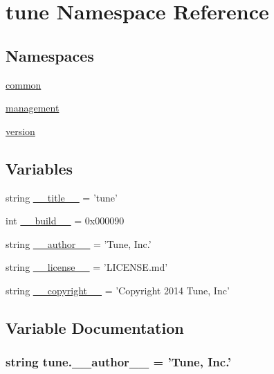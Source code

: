 \hypertarget{namespacetune}{\section{tune Namespace Reference}
\label{namespacetune}
}
\subsection*{Namespaces}
\begin{DoxyCompactItemize}
\item 
\hyperlink{namespacetune_1_1common}{common}
\item 
\hyperlink{namespacetune_1_1management}{management}
\item 
\hyperlink{namespacetune_1_1version}{version}
\end{DoxyCompactItemize}
\subsection*{Variables}
\begin{DoxyCompactItemize}
\item 
string \hyperlink{namespacetune_aebd95de7f1e0713438deabad8213f921}{\-\_\-\-\_\-title\-\_\-\-\_\-} = 'tune'
\item 
int \hyperlink{namespacetune_a6d8e129c5551d67c880bfa5e4deb52ab}{\-\_\-\-\_\-build\-\_\-\-\_\-} = 0x000090
\item 
string \hyperlink{namespacetune_a3ae77ee6e2838b0cfc0f246e9682aebc}{\-\_\-\-\_\-author\-\_\-\-\_\-} = 'Tune, Inc.'
\item 
string \hyperlink{namespacetune_a17571a6e3a57f5df06f9a721b48b853f}{\-\_\-\-\_\-license\-\_\-\-\_\-} = 'L\-I\-C\-E\-N\-S\-E.\-md'
\item 
string \hyperlink{namespacetune_a647f6c750f7edd2a15a877ca860f1751}{\-\_\-\-\_\-copyright\-\_\-\-\_\-} = 'Copyright 2014 Tune, Inc'
\end{DoxyCompactItemize}


\subsection{Variable Documentation}
\hypertarget{namespacetune_a3ae77ee6e2838b0cfc0f246e9682aebc}{
\subsubsection[{\-\_\-\-\_\-author\-\_\-\-\_\-}]{\setlength{\rightskip}{0pt plus 5cm}string tune.\-\_\-\-\_\-author\-\_\-\-\_\- = 'Tune, Inc.'}}\label{namespacetune_a3ae77ee6e2838b0cfc0f246e9682aebc}


